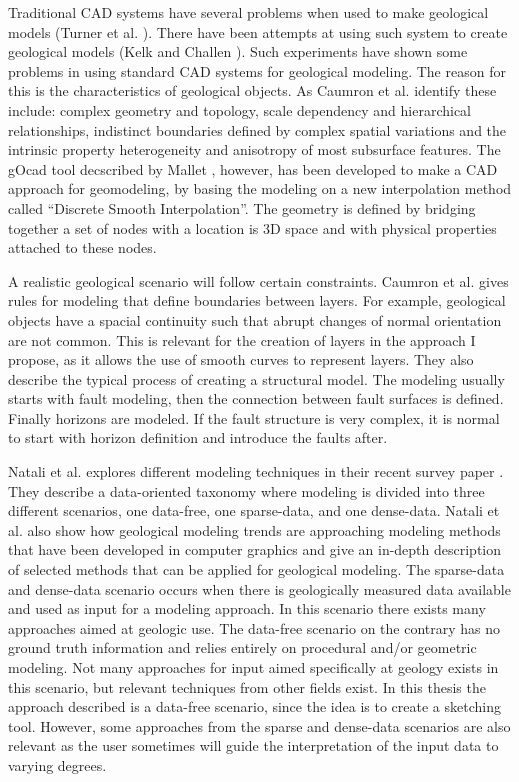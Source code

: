 \documentclass[a4paper,12pt]{report}
\begin{document}
Traditional CAD systems have several problems when used to make geological models (Turner et al. \cite{turner2006challenges}). There have been attempts at using such system to create geological models (Kelk and Challen \cite{kelk1992experiments}). Such experiments have shown some problems in using standard CAD systems for geological modeling. The reason for this is the characteristics of geological objects. As Caumron et al. \cite{caumon2009surface} identify these include: complex geometry and topology, scale dependency and hierarchical relationships, indistinct boundaries defined by complex spatial variations and the intrinsic property heterogeneity and anisotropy of most subsurface features. The gOcad tool decscribed by Mallet \cite{mallet1992gocad}, however, has been developed to make a CAD approach for geomodeling, by basing the modeling on a new interpolation method called ``Discrete Smooth Interpolation''. The geometry is defined by bridging together a set of nodes with a location is 3D space and with physical properties attached to these nodes.

A realistic geological scenario will follow certain constraints.  Caumron et al. gives rules for modeling that define boundaries between layers. For example, geological objects have a spacial continuity such that abrupt changes of normal orientation are not common. This is relevant for the creation of layers in the approach I propose, as it allows the use of smooth curves to represent layers. They also describe  the typical process of creating a structural model. The modeling usually starts with fault modeling, then the connection between fault surfaces is defined. Finally horizons are modeled. If the fault structure is very complex, it is normal to start with horizon definition and introduce the faults after.

Natali et al. explores different modeling techniques in their recent survey paper \cite{natali2013modeling}. They describe a data-oriented taxonomy where modeling is divided into three different scenarios, one data-free, one sparse-data, and one dense-data. Natali et al. also show how geological modeling trends are approaching modeling methods that have been developed in computer graphics and give an in-depth description of selected methods that can be applied for geological modeling. The sparse-data and dense-data scenario occurs when there is geologically measured data available and used as input for a modeling approach. In this scenario there exists many approaches aimed at geologic use. The data-free scenario on the contrary has no ground truth information and relies entirely on procedural and/or geometric modeling. Not many approaches for input aimed specifically at geology exists in this scenario, but relevant techniques from other fields exist. In this thesis the approach described is a data-free scenario, since the idea is to create a sketching tool. However, some approaches from the sparse and dense-data scenarios are also relevant as the user sometimes will guide the interpretation of the input data to varying degrees. 
\end{document}
